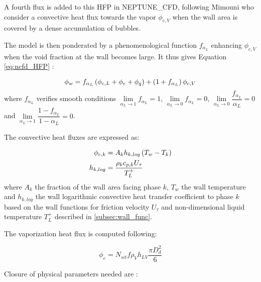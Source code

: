 A fourth flux is added to this HFP in NEPTUNE\_CFD, following Mimouni \etal\cite{mimouni_computational_2016} who consider a convective heat flux towards the vapor $\phi_{c,V}$ when the wall area is covered by a dense accumulation of bubbles. 

\npar

The model is then ponderated by a phenomenological function $f_{\alpha_{L}}$ enhancing $\phi_{c,V}$ when the void fraction at the wall becomes large. It thus gives Equation \ref{eq:ncfd_HFP} :

\begin{equation}
\phi_{w}=f_{\alpha_{L}} \left( \phi_{c,L}+\phi_{e}+\phi_{q} \right) + \left( 1+f_{\alpha_{L}}  \right)\phi_{c,V}
\label{eq:ncfd_HFP}
\end{equation}
where $f_{\alpha_{L}}$ verifies smooth conditions $\lim\limits_{\alpha_{L} \to 1} f_{\alpha_{L}} = 1$, $\lim\limits_{\alpha_{L} \to 0} f_{\alpha_{L}} = 0$, $\lim\limits_{\alpha_{L} \to 0} \dfrac{f_{\alpha_{L}} }{ \alpha_{L}} = 0$ and $\lim\limits_{\alpha_{L} \to 1} \dfrac{ 1 - f_{\alpha_{L}} }{ 1 - \alpha_{L}} = 0$.

\npar
The convective heat fluxes are expressed as:

\begin{align}
\phi_{c,k} &=A_{k}h_{k,log}\parth{T_{w}-T_{k}}\\
%
h_{k,log} &=\frac{ \rho_{k}c_{p,k}{U_{\tau}}}{{T_{L}^{+}} }
\label{eq:ncfd_hfc}
\end{align}
where $A_{k}$ the fraction of the wall area facing phase $k$, $T_{w}$ the wall temperature and $h_{k,log}$ the wall logarithmic convective heat transfer coefficient to phase $k$ based on the wall functions for friction velocity $U_{\tau}$ and non-dimensional liquid temperature $T_{L}^{+}$ described in \ref{subsec:wall_func}.

\npar
The vaporization heat flux is computed following:

\begin{equation}
\phi_{e}=N_{sit}f\rho_{V}h_{LV}\frac{\pi D_{d}^{2}}{6}
\label{eq:phie_NCFD}
\end{equation}


Closure of physical parameters needed are :

